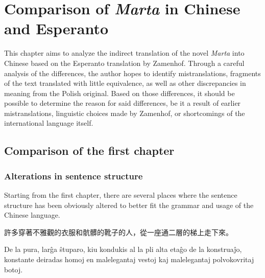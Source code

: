 \chapter{Comparison of \textit{Marta} in Chinese and Esperanto}

This chapter aims to analyze the indirect translation of the novel \textit{Marta} into Chinese based on the Esperanto translation by Zamenhof.
Through a careful analysis of the differences, the author hopes to identify mistranslations, fragments of the text translated with little equivalence, as well as other discrepancies in meaning from the Polish original.
Based on those differences, it should be possible to determine the reason for said differences, be it a result of earlier mistranslations, linguistic choices made by Zamenhof, or shortcomings of the international language itself.

\section{Comparison of the first chapter}

\subsection{Alterations in sentence structure}

Starting from the first chapter, there are several places where the sentence structure has been obviously altered to better fit the grammar and usage of the Chinese language.

許多穿著不雅觀的衣服和骯髒的靴子的人，從一座通二層的梯上走下來。

\begin{displayquote}
De la pura, larĝa ŝtuparo, kiu kondukis al la pli alta etaĝo de la konstruaĵo, konstante deiradas homoj en malelegantaj vestoj kaj malelegantaj polvokovritaj botoj.
\end{displayquote}
